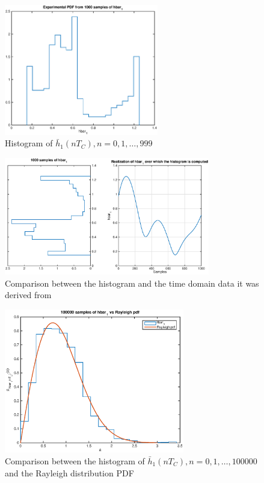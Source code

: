 \documentclass[10pt]{article}
\begin{document}
\begin{figure}[h!]
  \centering
  \includegraphics[width = 0.6\textwidth]{p01_h1hist}
  \caption{Histogram of $\bar{h}_1(nT_C), n = 0, 1, \dots, 999$}
  \label{fig:h1hist}
\end{figure}

\begin{figure}[h!]
  \centering
  \includegraphics[width = 0.8\textwidth]{p02_h1hist}
  \caption{Comparison between the histogram and the time domain data it was derived from}
  \label{fig:h1histvstime}
\end{figure}

\begin{figure}[h!]
  \centering
  \includegraphics[width = 0.7\textwidth]{p04_h1hist}
  \caption{Comparison between the histogram of $\bar{h}_1(nT_C), n = 0, 1, \dots, 100000$ and the Rayleigh distribution PDF}
  \label{fig:h1hist100000}
\end{figure}
\end{document}
